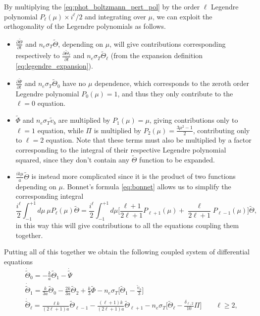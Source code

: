 By multiplying the \eqref{eq:phot_boltzmann_pert_pol} by the order $\ell$ Legendre polynomial $P_\ell(\mu)\times i^\ell/2$ and integrating over $\mu$, we can exploit the orthogonality of the Legendre polynomials as follows.
\begin{itemize}
    \item $\frac{\partial \tilde\Theta}{\partial t} $ and $n_e\sigma_T\tilde{\Theta}$, depending on $\mu$, will give contributions corresponding respectively to $\frac{\partial \tilde\Theta_\ell}{\partial t} $ and $n_e\sigma_T\tilde{\Theta}_\ell$ (from the expansion definition \eqref{eq:legendre_expansion}).
    \item $\frac{\partial\tilde\Psi}{\partial t}$ and $n_e\sigma_T\tilde\Theta_0$ have no $\mu$ dependence, which corresponds to the zeroth order Legendre polynomial $P_0(\mu)=1$, and thus they only contribute to the $\ell=0$ equation.
    \item $\tilde\Phi$ and $n_e\sigma_T\tilde v_b$ are multiplied by $P_1(\mu)=\mu$, giving contributions only to $\ell=1$ equation, while $\Pi$ is multiplied by $P_2(\mu)=\frac{3\mu^2-1}{2}$, contributing only to $\ell=2$ equation. Note that these terms must also be multiplied by a factor corresponding to the integral of their respective Legendre polynomial squared, since they don't contain any $\tilde\Theta$ function to be expanded.
    \item $\frac{ik\mu}{a}\tilde\Theta$ is instead more complicated since it is the product of two functions depending on $\mu$. Bonnet's formula \eqref{eq:bonnet} allows us to simplify the corresponding integral 
    $$\frac{i^\ell}{2}\int_{-1}^{+1}d\mu\ \mu P_\ell(\mu)\tilde\Theta=\frac{i^\ell}{2}\int_{-1}^{+1}d\mu \bigg[\frac{\ell+1}{2\ell+1}P_{\ell+1}(\mu)+\frac{\ell}{2\ell+1}P_{\ell-1}(\mu)\bigg]\tilde\Theta,$$
    in this way this will give contributions to all the equations coupling them together.
\end{itemize}
Putting all of this together we obtain the following coupled system of differential equations
\begin{subequations}\label{eq:multipole_boltzmann_photons}
    \begin{align}
           &\dot{\tilde{\Theta}}_0=-\frac{k}{a}\tilde{\Theta}_1-\dot{\tilde\Psi}\label{eq:multipole_boltzmann_photons_0}\\
            &\dot{\tilde{\Theta}}_1=\frac{k}{3a}\tilde\Theta_0-\frac{2k}{3a}\tilde\Theta_2+\frac{k}{3}\tilde\Phi-n_e\sigma_T\bigg[\tilde\Theta_1-\frac{\tilde v_b}{3}\bigg]\label{eq:multipole_boltzmann_photons_2}\\
            &\dot{\tilde{\Theta}}_\ell=\frac{\ell k}{(2\ell+1)a}\tilde\Theta_{\ell-1}-\frac{(\ell+1)k}{(2\ell+1)a}\tilde\Theta_{\ell+1}-n_e\sigma_T\bigg[\tilde\Theta_\ell-\frac{\delta_{\ell,2}}{10}\Pi\bigg]\qquad \ell\geq 2,\label{eq:multipole_boltzmann_photons_3}
        \end{align}
\end{subequations}

